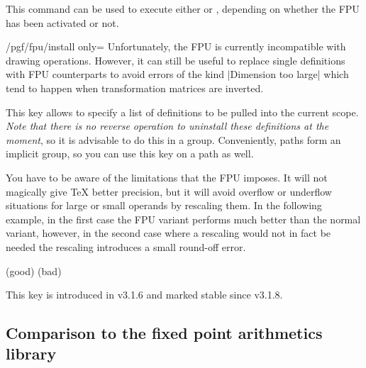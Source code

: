 \begin{command}{\pgflibraryfpuifactive{}}
    This command can be used to execute either  or
    , depending on whether the FPU has been activated or not.
\end{command}

\begin{key}{/pgf/fpu/install only=}
    \label{fpu-install-only}
    Unfortunately, the FPU is currently incompatible with drawing operations.
    However, it can still be useful to replace single definitions with FPU
    counterparts to avoid errors of the kind |Dimension too large| which tend
    to happen when transformation matrices are inverted.

    This key allows to specify a list of definitions to be pulled into the
    current scope.  \emph{Note that there is no reverse operation to uninstall
    these definitions at the moment}, so it is advisable to do this in a group.
    Conveniently, \tikzname{} paths form an implicit group, so you can use this
    key on a path as well.

    You have to be aware of the limitations that the FPU imposes.  It will not
    magically give \TeX{} better precision, but it will avoid overflow or
    underflow situations for large or small operands by rescaling them.  In the
    following example, in the first case the FPU variant performs much better
    than the normal variant, however, in the second case where a rescaling
    would not in fact be needed the rescaling introduces a small round-off
    error.
\begin{codeexample}[
    preamble={\usepgflibrary{fpu}},
    pre={\pgfkeys{/pgf/fpu=false}},
]
\begingroup
{}
\pgfmathresult (good)
\pgfmathresult (bad)
\endgroup
\end{codeexample}
    This key is introduced in \pgfname v3.1.6 and marked stable since \pgfname
    v3.1.8.
\end{key}


\subsection{Comparison to the fixed point arithmetics library}

